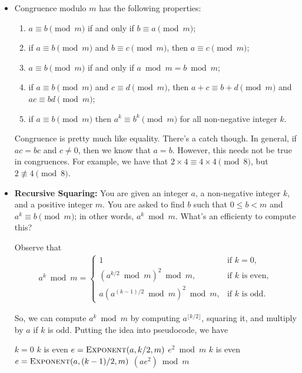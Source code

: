 \documentclass{article}
\begin{document}
\begin{itemize}
\item Congruence modulo $m$ has the following properties:
\begin{enumerate}
\item $a \equiv b \pmod m$ if and only if $b \equiv a \pmod m$;
\item if $a \equiv b \pmod m$ and $b \equiv c \pmod m$, then $a \equiv c \pmod m$;
\item $a \equiv b \pmod m$ if and only if $a \bmod m = b \bmod m$;
\item if $a \equiv b \pmod m$ and $c \equiv d \pmod m$, then $a+c \equiv b+d \pmod m$ and $ac \equiv bd \pmod m$;
\item if $a \equiv b \pmod m$ then $a^k \equiv b^k \pmod m$ for all non-negative integer $k$.
\end{enumerate}
Congruence is pretty much like equality. There's a catch though. In general, if $ac = bc$ and $c \neq 0$, then we know that $a = b$. However, this needs not be true in congruences. For example, we have that $2\times 4 \equiv 4 \times 4 \pmod 8$, but $2 \not\equiv 4 \pmod 8$.

\item {\bf Recursive Squaring:} You are given an integer $a$, a non-negative integer $k$, and a positive integer $m$. You are asked to find $b$ such that $0 \leq b < m$ and $a^k \equiv b \pmod m$; in other words, $a^k \bmod m$. What's an efficienty to compute this? 

Observe that
\begin{align*}
a^k \bmod m = \begin{cases}
1 & \mbox{if }k=0,\\
(a^{k/2} \bmod m)^2 \bmod m, & \mbox{if $k$ is even},\\
a(a^{(k-1)/2} \bmod m)^2 \bmod m, & \mbox{if $k$ is odd}.
\end{cases}
\end{align*}

So, we can compute $a^k \bmod m$ by computing $a^{\lfloor k/2 \rfloor}$, squaring it, and multiply by $a$ if $k$ is odd. Putting the idea into pseudocode, we have

\begin{codebox}
\li \If $k = 0$
\li     \Then {}
\li \ElseIf $k$ is even
\li     \Then $e = \textnormal{\scshape Exponent}(a,k/2,m)$
\li           \Return $e^2 \bmod m$
\li \ElseIf $k$ is even
\li     \Then $e = \textnormal{\scshape Exponent}(a,(k-1)/2,m)$
\li           \Return $(ae^2) \bmod m$
        \End
\end{codebox}


\end{itemize}
\end{document}
